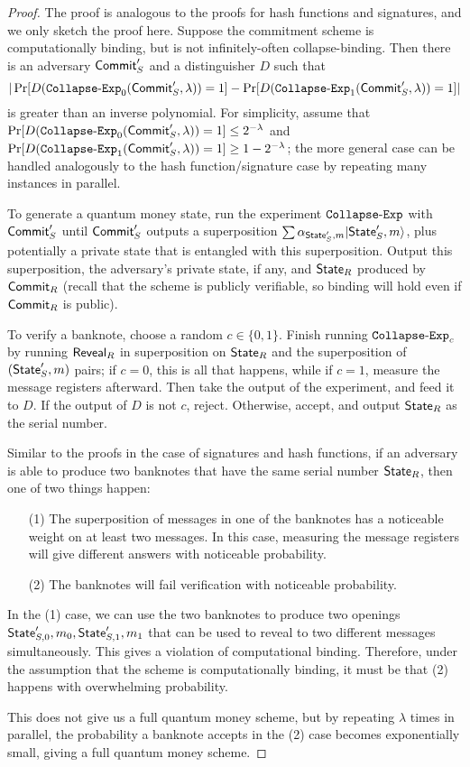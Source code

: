 \begin{proof}  The proof is analogous to the proofs for hash functions and signatures, and we only sketch the proof here.  
Suppose the commitment scheme is computationally binding, but is not infinitely-often collapse-binding.  Then there is an adversary ${\sf Commit}_S'$ and a distinguisher $D$ such that \[|\Pr[D({\tt{Collapse\text{-}Exp}}_0({\sf Commit}_S',\lambda))=1]-\Pr[D({\tt{Collapse\text{-}Exp}}_1({\sf Commit}_S',\lambda))=1]|\]
is greater than an inverse polynomial.  For simplicity, assume that $\Pr[D({\tt{Collapse\text{-}Exp}}_0({\sf Commit}_S',\lambda))=1]\leq 2^{-\lambda}$ and $\Pr[D({\tt{Collapse\text{-}Exp}}_1({\sf Commit}_S',\lambda))=1]\geq 1-2^{-\lambda}$; the more general case can be handled analogously to the hash function/signature case by repeating many instances in parallel.

To generate a quantum money state, run the experiment ${\tt{Collapse\text{-}Exp}}$ with ${\sf Commit}_S'$ until ${\sf Commit}_S'$ outputs a superposition $\sum \alpha_{{\sf State}_S',m}|{\sf State}_S',m\rangle$, plus potentially a private state that is entangled with this superposition.  Output this superposition, the adversary's private state, if any, and ${\sf State}_R$ produced by ${\sf Commit}_R$ (recall that the scheme is publicly verifiable, so binding will hold even if ${\sf Commit}_R$ is public).

To verify a banknote, choose a random $c\in\{0,1\}$.  Finish running ${\tt{Collapse\text{-}Exp}}_c$ by running ${\sf Reveal}_R$ in superposition on ${\sf State}_R$ and the superposition of $({\sf State}_S',m)$ pairs; if $c=0$, this is all that happens, while if $c=1$, measure the message registers afterward.  Then take the output of the experiment, and feed it to $D$.  If the output of $D$ is not $c$, reject.  Otherwise, accept, and output ${\sf State}_R$ as the serial number.

Similar to the proofs in the case of signatures and hash functions, if an adversary is able to produce two banknotes that have the same serial number ${\sf State}_R$, then one of two things happen:
\begin{itemize}
	\item[(1)] The superposition of messages in one of the banknotes has a noticeable weight on at least two messages.  In this case, measuring the message registers will give different answers with noticeable probability.
	\item[(2)] The banknotes will fail verification with noticeable probability.
\end{itemize}

In the (1) case, we can use the two banknotes to produce two openings ${\sf State}_{S,0}',m_0,{\sf State}_{S,1}',m_1$ that can be used to reveal to two different messages simultaneously.  This gives a violation of computational binding.  Therefore, under the assumption that the scheme is computationally binding, it must be that (2) happens with overwhelming probability.

This does not give us a full quantum money scheme, but by repeating $\lambda$ times in parallel, the probability a banknote accepts in the (2) case becomes exponentially small, giving a full quantum money scheme.\end{proof}



